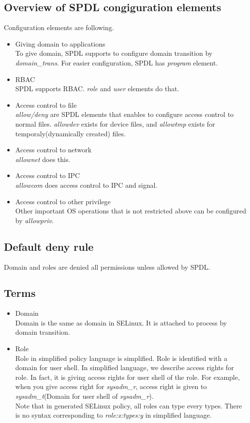 \documentclass{article}
\begin{document}
\subsection{Overview of SPDL congiguration elements}
Configuration elements are following.
\begin{itemize}
 \item Giving domain to applications\\
       To give domain, SPDL  supports to configure domain transition by
       {\it domain\_trans}. For easier configuration, SPDL has {\it
       program} element.
 \item RBAC\\
       SPDL supports RBAC. {\it role} and {\it user} elements do that.
 \item Access control to file\\       
       {\it allow/deny} are SPDL elements that enables to configure
       access control to normal files. {\it allowdev} exists for device
       files, and {\it allowtmp} exists for temporaly(dynamically
       created) files.
 \item Access control to network\\
       {\it allownet} does this.
 \item Access control to IPC\\
       {\it allowcom} does access control to IPC and signal.
 \item Access control to other privilege\\
       Other important OS operations that is not restricted above can be
       configured by {\it allowpriv}.
\end{itemize}

\subsection{Default deny rule}
Domain and roles are denied all permissions unless allowed by SPDL.

\subsection{Terms}
\begin{itemize}
\item Domain \\
 Domain is the same as domain in SELinux. It is attached to process by domain transition.
\item Role\\
 Role in simplified policy language is simplified. Role is identified
      with a domain for user shell. In simplified language, we describe access
      rights for role. In fact, it is giving access rights for user
      shell of the role. For example, when you give access right for
      {\it sysadm\_r}, access right is given to 
{\it sysadm\_t}(Domain for user shell of {\it sysadm\_r}).\\
 Note that in generated SELinux policy, all roles can type every types.
      There is no syntax corresponding to {\it role:x:types:y} in simplified language.
\end{itemize}                  
\end{document}
